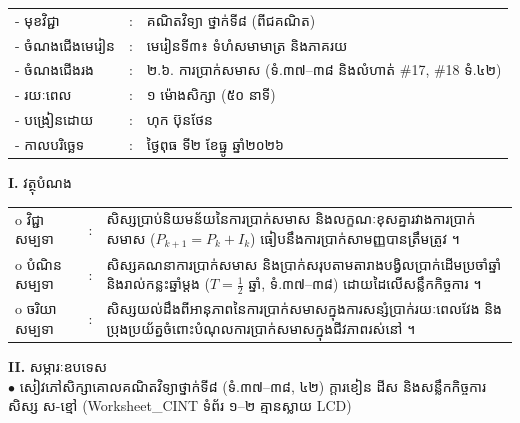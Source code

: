 \documentclass[a4paper,10pt]{article}
\newcommand{\wcirc}{{\CourierBullet\fontsize{9.5pt}{11pt}\selectfont o}}
\newcommand{\en}[1]{{\TimesEn #1}}
\begin{document}
{\renewcommand{\arraystretch}{0.98}
\hspace*{3.1cm}%
\begin{tabular}{@{}l l L{11.0cm}@{}}
  - \hspace{0.35cm} មុខវិជ្ជា & : & គណិតវិទ្យា ថ្នាក់ទី៨ (ពីជគណិត) \\
  - \hspace{0.35cm} ចំណងជើងមេរៀន & : & មេរៀនទី៣៖ ទំហំសមាមាត្រ និងភាគរយ \\
  - \hspace{0.35cm} ចំណងជើងរង & : & ២.៦. ការប្រាក់សមាស (ទំ.៣៧–៣៨ និងលំហាត់ \#17, \#18 ទំ.៤២) \\
  - \hspace{0.35cm} រយៈពេល & : & ១ ម៉ោងសិក្សា (៥០ នាទី) \\
  - \hspace{0.35cm} បង្រៀនដោយ & : & ហុក ប៊ុនថែន \\
  - \hspace{0.35cm} កាលបរិច្ឆេទ & : & ថ្ងៃពុធ ទី២ ខែធ្នូ ឆ្នាំ២០២៦ \\
\end{tabular}

\vspace{2pt}

\textbf{I.} {\muol វត្ថុបំណង}\\[1pt]
\hspace*{0.55cm}%
\begin{tabular}{@{}l l L{14.2cm}@{}}
  \wcirc \hspace{0.25cm} វិជ្ជាសម្បទា & : & សិស្សប្រាប់និយមន័យនៃការប្រាក់សមាស និងលក្ខណៈខុសគ្នារវាងការប្រាក់សមាស ($P_{k+1} = P_k + I_k$) ធៀបនឹងការប្រាក់សាមញ្ញបានត្រឹមត្រូវ ។ \\
  \wcirc \hspace{0.25cm} បំណិនសម្បទា & : & សិស្សគណនាការប្រាក់សមាស និងប្រាក់សរុបតាមតារាងបង្វិលប្រាក់ដើមប្រចាំឆ្នាំ និងរាល់កន្លះឆ្នាំម្ដង ($T = \frac{1}{2}$ ឆ្នាំ, ទំ.៣៧–៣៨) ដោយដៃលើសន្លឹកកិច្ចការ ។ \\
  \wcirc \hspace{0.25cm} ចរិយាសម្បទា & : & សិស្សយល់ដឹងពីអានុភាពនៃការប្រាក់សមាសក្នុងការសន្សំប្រាក់រយៈពេលវែង និងប្រុងប្រយ័ត្នចំពោះបំណុលការប្រាក់សមាសក្នុងជីវភាពរស់នៅ ។ \\
\end{tabular}

\vspace{2pt}

\textbf{II.} {\muol សម្ភារៈឧបទេស}\\[1pt]
\hspace*{0.55cm}$\bullet$ \hspace{0.35cm} សៀវភៅសិក្សាគោលគណិតវិទ្យាថ្នាក់ទី៨ (ទំ.៣៧–៣៨, ៤២) ក្ដារខៀន ដីស និងសន្លឹកកិច្ចការសិស្ស ស-ខ្មៅ (\en{Worksheet\_CINT} ទំព័រ ១–២ គ្មានស្លាយ \en{LCD})

}
\end{document}
